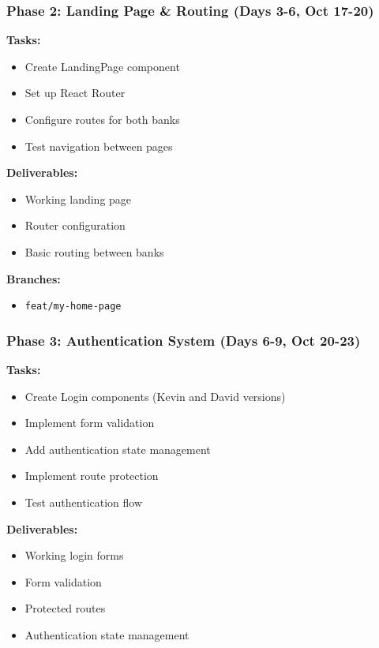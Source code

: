 \documentclass[11pt,a4paper]{article}
\begin{document}
\subsubsection{Phase 2: Landing Page \& Routing (Days 3-6, Oct 17-20)}
\textbf{Tasks:}
\begin{itemize}[leftmargin=*]
    \item Create LandingPage component
    \item Set up React Router
    \item Configure routes for both banks
    \item Test navigation between pages
\end{itemize}

\textbf{Deliverables:}
\begin{itemize}[leftmargin=*]
    \item Working landing page
    \item Router configuration
    \item Basic routing between banks
\end{itemize}

\textbf{Branches:}
\begin{itemize}[leftmargin=*]
    \item \texttt{feat/my-home-page}
\end{itemize}

\subsubsection{Phase 3: Authentication System (Days 6-9, Oct 20-23)}
\textbf{Tasks:}
\begin{itemize}[leftmargin=*]
    \item Create Login components (Kevin and David versions)
    \item Implement form validation
    \item Add authentication state management
    \item Implement route protection
    \item Test authentication flow
\end{itemize}

\textbf{Deliverables:}
\begin{itemize}[leftmargin=*]
    \item Working login forms
    \item Form validation
    \item Protected routes
    \item Authentication state management
\end{itemize}
\end{document}
